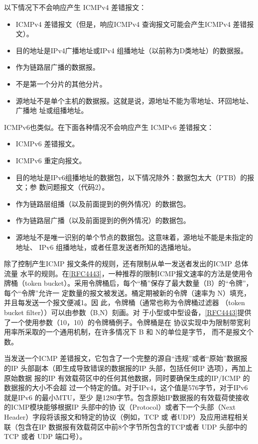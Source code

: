 以下情况下不会响应产生 ICMPv4 差错报文：
\begin{itemize}
	\item ICMPv4 差错报文（但是，响应ICMPv4 查询报文可能会产生ICMPv4 差错报文）。
	\item 目的地址是IPv4广播地址或IPv4 组播地址（以前称为D类地址）的数据报。
	\item 作为链路层广播的数据报。
	\item 不是第一个分片的其他分片。
	\item 源地址不是单个主机的数据报。这就是说，源地址不能为零地址、环回地址、广播地
	      址或组播地址。
\end{itemize}

ICMPv6也类似。在下面各种情况不会响应产生 ICMPv6 差错报文：
\begin{itemize}
	\item ICMPv6 差错报文。
	\item ICMPv6 重定向报文。
	\item 目的地址是IPv6组播地址的数据包，以下情况除外：数据包太大（PTB）的报文；参
	      数问题报文（代码2）。
	\item 作为链路层组播（以及前面提到的例外情况）的数据包。
	\item 作为链路层广播（以及前面提到的例外情况）的数据包。
	\item 源地址不是唯一识别的单个节点的数据包。这意味着，源地址不能是未指定的地址、
	      IPv6 组播地址，或者任意发送者所知的选播地址。
\end{itemize}

除了控制产生ICMP 报文条件的规则，还有限制从单一发送者发出的ICMP 总体流量
水平的规则。在\href{https://www.rfc-editor.org/rfc/rfc4443}{[RFC4443]}，一种推荐的限制ICMP报文速率的方法是使用令牌桶（token
bucket）。采用令牌桶后，每个“桶”保存了最大数量（B）的“令牌”，每个“令牌”允许一
定数量的报文被发送。桶定期被新的令牌（速率为 N）填充，并且每发送一个报文便减1。因
此，令牌桶（通常也称为令牌桶过滤器 （token bucket filter））可以由参数（B,N）刻画。对
于小型或中型设备，\href{https://www.rfc-editor.org/rfc/rfc4443}{[RFC4443]}提供了一个使用参数（10，10）的令牌桶例子。令牌桶是在
协议实现中为限制带宽利用率所采取的一个通用机制，在许多情况下 B 和 N的单位是字节，
而不是报文个数。

当发送一个ICMP 差错报文，它包含了一个完整的源自“违规”或者“原始”数据报
的IP 头部副本（即生成导致错误的数据报的IP 头部，包括任何IP 选项），再加上原始数据
报的IP 有效载荷区中的任何其他数据，同时要确保生成的IP/ICMP 的数据报的大小不会超
过一个特定的值。对于IPv4，这个值是576字节，对于IPv6 就是IPv6 的最小MTU，至少
是1280字节。包含原始IP数据报的有效载荷使接收的ICMP模块能够根据IP 头部中的协
议（Protocol）或者下一个头部（Next Header）字段将该报文和特定的协议（例如，TCP 或
者UDP）及应用进程相关联（包含在IP 数据报有效载荷区中前8个字节所包含的TCP或者
UDP 头部中的TCP 或者 UDP 端口号）。

